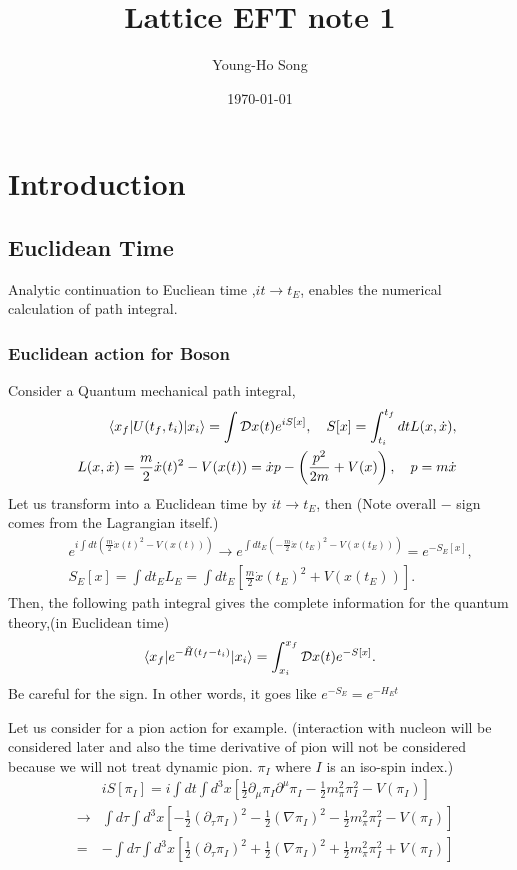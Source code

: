 \documentclass[10pt]{book}
\title{Lattice EFT note 1}
\author{Young-Ho Song}
\date{\today}
\newcommand{\bea}{\begin{eqnarray}}
\newcommand{\eea}{\end{eqnarray}}
\newcommand{\no}{\nonumber \\}
\newcommand{\del}{\partial}
\def\la{\langle}
\def\ra{\rangle}
\begin{document}
\maketitle
\tableofcontents
\newpage

\chapter{Introduction}

\section{Euclidean Time}
Analytic continuation to Eucliean time ,$it\to t_E$, enables 
the numerical calculation of path integral.

\subsection{Euclidean action for Boson} 
Consider a Quantum mechanical path integral,
\bea 
& &\la x_f|U(t_f,t_i)|x_i\ra=\int {\cal D}x(t) e^{i S[x]} ,\quad  S[x]=\int_{t_i}^{t_f} dt L(x,\dot{x}), \no  
& &L(x,\dot{x})=\frac{m}{2}\dot{x}(t)^2 - V(x(t))=\dot{x}p -\left(\frac{p^2}{2m}+V(x) \right) , \quad p=m\dot{x} 
\eea 
Let us transform into a Euclidean time by $it\to t_E$, then (Note overall $-$ sign comes from the Lagrangian itself.)
\bea 
& &e^{i\int dt (\frac{m}{2}\dot{x}(t)^2 - V(x(t)))}\to e^{\int dt_E (-\frac{m}{2}\dot{x}(t_E)^2 - V(x(t_E))) }
= e^{-S_{E}[x]} ,\no 
& &  S_{E}[x]=\int dt_E L_E =\int dt_E \left[\frac{m}{2}\dot{x}(t_E)^2 + V(x(t_E))\right]. 
\eea 
Then, the following path integral gives the complete information for the quantum theory,(in Euclidean time)
\bea 
\la x_f|e^{-\tilde{H}(t_f-t_i)}|x_i\ra =\int_{x_i}^{x_f} {\cal D}x(t) e^{-S[x]}.
\eea 
{\color{red}  Be careful for the sign. In other words, it goes like $e^{-S_E}=e^{-H_E t}$}

Let us consider for a pion action for example. (interaction with nucleon will be considered later
and also the time derivative of pion will not be considered because we will not treat 
dynamic pion. $\pi_I$ where $I$ is an iso-spin index.)
\bea 
& &i S[\pi_I]=i\int dt \int d^3 x \left[\frac{1}{2}\del_\mu\pi_I \del^\mu \pi_I -\frac{1}{2}m_\pi^2\pi_I^2
                                  -V(\pi_I)\right] \no 
&\to& \int d\tau \int d^3 x \left[-\frac{1}{2}(\del_\tau \pi_I)^2 -\frac{1}{2}(\nabla \pi_I)^2 
                                  -\frac{1}{2}m_\pi^2\pi_I^2 -V(\pi_I)\right] \no 
&=& -\int d\tau \int d^3 x \left[\frac{1}{2}(\del_\tau \pi_I)^2 +\frac{1}{2}(\nabla \pi_I)^2 
+\frac{1}{2}m_\pi^2\pi_I^2 +V(\pi_I)\right]                                                                  
\eea 
\end{document}
